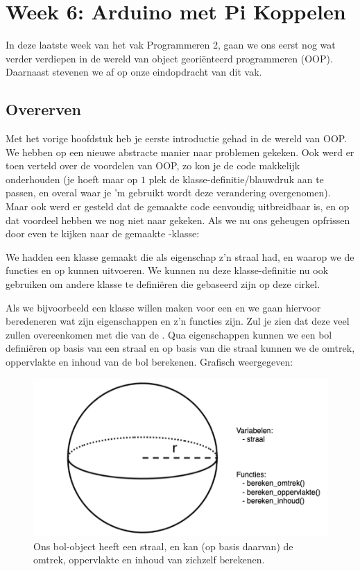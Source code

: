 \chapter{Week 6: Arduino met Pi Koppelen}

In deze laatste week van het vak Programmeren 2, gaan we ons eerst nog wat verder verdiepen in de wereld van object georiënteerd programmeren (OOP). Daarnaast stevenen we af op onze eindopdracht van dit vak.

\section{Overerven}
Met het vorige hoofdstuk heb je eerste introductie gehad in de wereld van OOP. We hebben op een nieuwe abstracte manier naar problemen gekeken. Ook werd er toen verteld over de voordelen van OOP, zo kon je de code makkelijk onderhouden (je hoeft maar op $1$ plek de klasse-definitie/blauwdruk aan te passen, en overal waar je 'm gebruikt wordt deze verandering overgenomen). Maar ook werd er gesteld dat de gemaakte code eenvoudig uitbreidbaar is, en op dat voordeel hebben we nog niet naar gekeken. Als we nu ons geheugen opfrissen door even te kijken naar de gemaakte -klasse:


We hadden een klasse  gemaakt die als eigenschap z'n straal had, en waarop we de functies  en  op kunnen uitvoeren. We kunnen nu deze klasse-definitie nu ook gebruiken om andere klasse te definiëren die gebaseerd zijn op deze cirkel.  

Als we bijvoorbeeld een klasse willen maken voor een  en we gaan hiervoor beredeneren wat zijn eigenschappen en z'n functies zijn. Zul je zien dat deze veel zullen overeenkomen met die van de . Qua eigenschappen kunnen we een bol definiëren op basis van een straal en op basis van die straal kunnen we de omtrek, oppervlakte en inhoud van de bol berekenen. Grafisch weergegeven:
\begin{figure}[h!]
\centering\includegraphics[scale=0.7]{Pictures/chapter08/bol.png}
\caption{\small Ons bol-object heeft een straal, en kan (op basis daarvan) de omtrek, oppervlakte en inhoud van zichzelf berekenen.}
\label{fig:bol} %
\end{figure}

